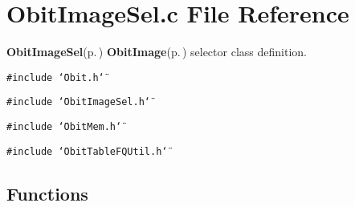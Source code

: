 \section{Obit\-Image\-Sel.c File Reference}
\label{ObitImageSel_8c}
{\bf Obit\-Image\-Sel}{\rm (p.\,\pageref{structObitImageSel})} {\bf Obit\-Image}{\rm (p.\,\pageref{structObitImage})} selector class definition. 

{\tt \#include \char`\"{}Obit.h\char`\"{}}\par
{\tt \#include \char`\"{}Obit\-Image\-Sel.h\char`\"{}}\par
{\tt \#include \char`\"{}Obit\-Mem.h\char`\"{}}\par
{\tt \#include \char`\"{}Obit\-Table\-FQUtil.h\char`\"{}}\par
\subsection*{Functions}
